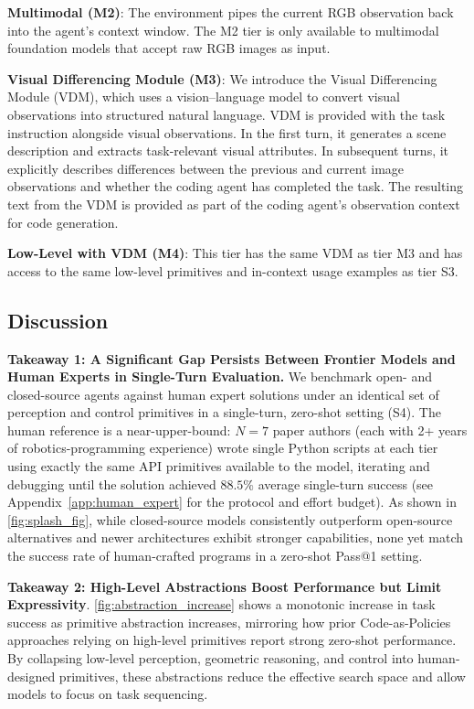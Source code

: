 \textbf{Multimodal (M2)}: The environment pipes the current RGB observation back into the agent's context window. The M2 tier is only available to multimodal foundation models that accept raw RGB images as input.

\textbf{Visual Differencing Module (M3)}: We introduce the Visual Differencing Module (VDM), which uses a vision–language model to convert visual observations into structured natural language. VDM is provided with the task instruction alongside visual observations. In the first turn, it generates a scene description and extracts task-relevant visual attributes. In subsequent turns, it explicitly describes differences between the previous and current image observations and whether the coding agent has completed the task. The resulting text from the VDM is provided as part of the coding agent’s observation context for code generation.

\textbf{Low-Level with VDM (M4)}: This tier has the same VDM as tier M3 and has access to the same low-level primitives and in-context usage examples as tier S3.  



\subsection{Discussion}

\textbf{Takeaway 1: A Significant Gap Persists Between Frontier Models and Human Experts in Single-Turn Evaluation.} 
We benchmark open- and closed-source agents against human expert solutions under an identical set of perception and control primitives in a single-turn, zero-shot setting (S4). The human reference is a near-upper-bound: $N{=}7$ paper authors (each with 2+ years of robotics-programming experience) wrote single Python scripts at each tier using exactly the same API primitives available to the model, iterating and debugging until the solution achieved $88.5\%$ average single-turn success (see Appendix~\ref{app:human_expert} for the protocol and effort budget). As shown in \cref{fig:splash_fig}, while closed-source models consistently outperform open-source alternatives and newer architectures exhibit stronger capabilities, none yet match the success rate of human-crafted programs in a zero-shot Pass@1 setting.


\textbf{Takeaway 2: High-Level Abstractions Boost Performance but Limit Expressivity}. 
\cref{fig:abstraction_increase} shows a monotonic increase in task success as primitive abstraction increases, mirroring how prior Code-as-Policies~\cite{liang2023code} approaches relying on high-level primitives report strong zero-shot performance. By collapsing low-level perception, geometric reasoning, and control into human-designed primitives, these abstractions reduce the effective search space and allow models to focus on task sequencing.


